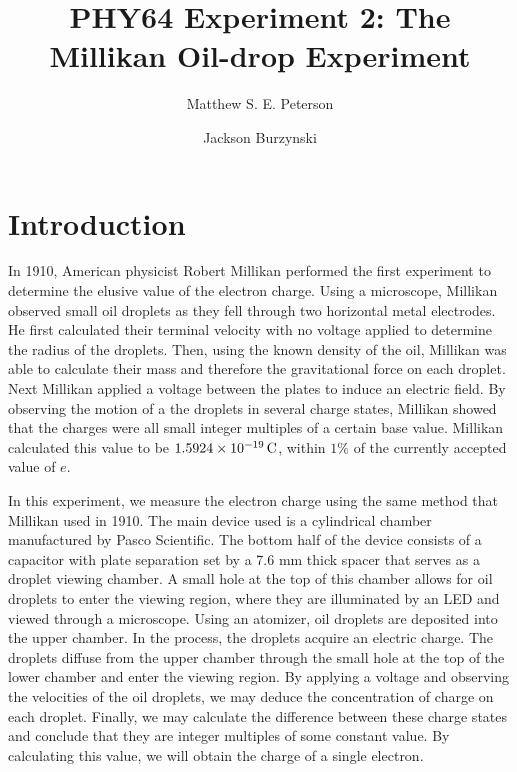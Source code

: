 \documentclass[aps, reprint,amsmath,amssymb]{revtex4-1} %
\begin{document}
\title{PHY64 Experiment 2: The Millikan Oil-drop Experiment}
\author{Matthew S. E. Peterson}
\author{Jackson Burzynski}
\maketitle

\section{Introduction}

In 1910, American physicist Robert Millikan performed the first experiment to determine the elusive value of the electron charge. Using a microscope, Millikan observed small oil droplets as they fell through two horizontal metal electrodes. He first calculated their terminal velocity with no voltage applied to determine the radius of the droplets. Then, using the known density of the oil, Millikan was able to calculate their mass and therefore the gravitational force on each droplet. Next Millikan applied a voltage between the plates to induce an electric field. By observing the motion of a the droplets in several charge states, Millikan showed that the charges were all small integer multiples of a certain base value. Millikan calculated this value to be $\SI{1.5924 e -19}{C}$, within $1\%$ of the currently accepted value of $e$. 

In this experiment, we measure the electron charge using the same method that Millikan used in 1910. The main device used is a cylindrical chamber manufactured by Pasco Scientific. The bottom half of the device consists of a capacitor with plate separation set by a 7.6 mm thick spacer that serves as a droplet viewing chamber. A small hole at the top of this chamber allows for oil droplets to enter the viewing region, where they are illuminated by an LED and viewed through a microscope. Using an atomizer, oil droplets are deposited into the upper chamber. In the process, the droplets acquire an electric charge. The droplets diffuse from the upper chamber through the small hole at the top of the lower chamber and enter the viewing region. By applying a voltage and observing the velocities of the oil droplets, we may deduce the concentration of charge on each droplet. Finally, we may calculate the difference between these charge states and conclude that they are integer multiples of some constant value. By calculating this value, we will obtain the charge of a single electron.
\end{document}
